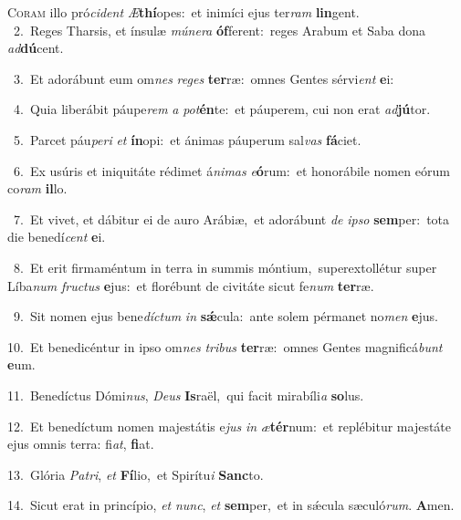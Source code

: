 \lettrine{\initial\textcolor{\initialcolor}{C}}{oram} illo pró\-\textit{ci}\-\textit{dent} \textit{Æ}\-\textbf{thí}opes:~\star et inimíci ejus ter\textit{ram} \textbf{lin}\-gent.\\
{\numbfont\textcolor{\numbcolor}{~2.}}~Reges Tharsis, et ínsulæ \textit{mú}\-\textit{ne}\textit{ra} \textbf{óf}\-ferent:~\star reges Arabum et Saba dona \textit{ad}\-\textbf{dú}cent.\par
{\numbfont\textcolor{\numbcolor}{~3.}}~Et adorábunt eum om\textit{nes} \textit{re}\-\textit{ges} \textbf{ter}\-ræ:~\star omnes Gentes sérvi\textit{ent} \textbf{e}\-i:\par
{\numbfont\textcolor{\numbcolor}{~4.}}~Quia liberábit páupe\textit{rem} \textit{a} \textit{pot}\-\textbf{én}te:~\star et páuperem, cui non erat \textit{ad}\-\textbf{jú}tor.\par
{\numbfont\textcolor{\numbcolor}{~5.}}~Parcet páu\-\textit{pe}\-\textit{ri} \textit{et} \textbf{ín}\-opi:~\star et ánimas páuperum sal\textit{vas} \textbf{fá}\-ciet.\par
{\numbfont\textcolor{\numbcolor}{~6.}}~Ex usúris et iniquitáte rédimet á\-\textit{ni}\-\textit{mas} \textit{e}\-\textbf{ó}rum:~\star et honorábile nomen eórum co\textit{ram} \textbf{il}\-lo.\par
{\numbfont\textcolor{\numbcolor}{~7.}}~Et vivet, et dábitur ei de auro Arábiæ,~\dagger et adorábunt \textit{de} \textit{ip}\-\textit{so} \textbf{sem}\-per:~\star tota die benedí\textit{cent} \textbf{e}\-i.\par
{\numbfont\textcolor{\numbcolor}{~8.}}~Et erit firmaméntum in terra in summis móntium,~\dagger superextollétur super Líba\textit{num} \textit{fruc}\-\textit{tus} \textbf{e}\-jus:~\star et florébunt de civitáte sicut fe\textit{num} \textbf{ter}\-ræ.\par
{\numbfont\textcolor{\numbcolor}{~9.}}~Sit nomen ejus bene\-\textit{díc}\-\textit{tum} \textit{in} \textbf{sǽ}\-cula:~\star ante solem pérmanet no\textit{men} \textbf{e}\-jus.\par
{\numbfont\textcolor{\numbcolor}{10.}}~Et benedicéntur in ipso om\textit{nes} \textit{tri}\-\textit{bus} \textbf{ter}\-ræ:~\star omnes Gentes magnificá\textit{bunt} \textbf{e}\-um.\par
{\numbfont\textcolor{\numbcolor}{11.}}~Benedíctus Dómi\-\textit{nus}\-, \textit{De}\-\textit{us} \textbf{Is}\-raël,~\star qui facit mirabíli\textit{a} \textbf{so}\-lus.\par
{\numbfont\textcolor{\numbcolor}{12.}}~Et benedíctum nomen majestátis e\textit{jus} \textit{in} \textit{æ}\-\textbf{tér}num:~\star et replébitur majestáte ejus omnis terra: fi\-\textit{at}\-, \textbf{fi}\-at.\par
{\numbfont\textcolor{\numbcolor}{13.}}~Glória \textit{Pa}\-\textit{tri}, \textit{et} \textbf{Fí}\-lio,~\star et Spirítu\textit{i} \textbf{Sanc}\-to.\par
{\numbfont\textcolor{\numbcolor}{14.}}~Sicut erat in princípio, \textit{et} \textit{nunc}\-, \textit{et} \textbf{sem}\-per,~\star et in sǽcula sæculó\-\textit{rum}\-. \textbf{A}\-men.\par
